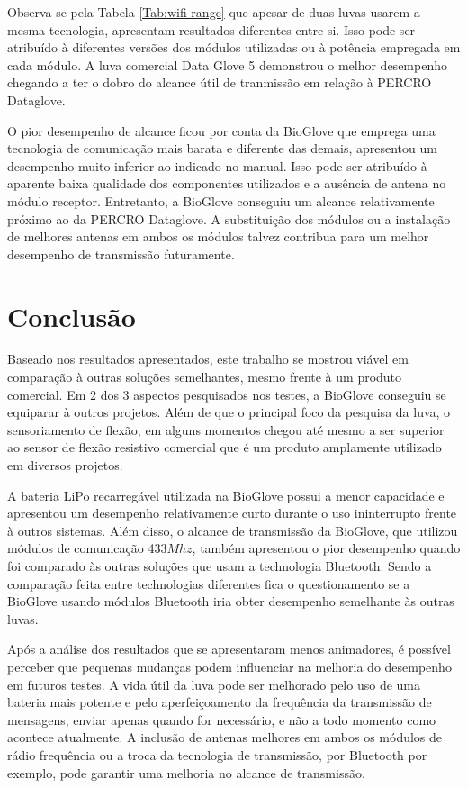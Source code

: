 \documentclass[
	12pt,				%
	openright,			%
	oneside,			%
	a4paper,			%
	english,			%
	brazil				%
	]{abntex2}
\begin{document}
			Observa-se pela Tabela \ref{Tab:wifi-range} que apesar de duas luvas usarem a mesma tecnologia, apresentam resultados diferentes entre si. Isso pode ser atribuído à diferentes versões dos módulos utilizadas ou à potência empregada em cada módulo. A luva comercial Data Glove 5 demonstrou o melhor desempenho chegando a ter o dobro do alcance útil de tranmissão em relação à PERCRO Dataglove.

			O pior desempenho de alcance ficou por conta da BioGlove que emprega uma tecnologia de comunicação mais barata e diferente das demais, apresentou um desempenho muito inferior ao indicado no manual. Isso pode ser atribuído à aparente baixa qualidade dos componentes utilizados e a ausência de antena no módulo receptor. Entretanto, a BioGlove conseguiu um alcance relativamente próximo ao da PERCRO Dataglove. A substituição dos módulos ou a instalação de melhores antenas em ambos os módulos talvez contribua para um melhor desempenho de transmissão futuramente.





		\chapter{Conclusão}
		
		Baseado nos resultados apresentados, este trabalho se mostrou viável em comparação à outras soluções semelhantes, mesmo frente à um produto comercial. Em 2 dos 3 aspectos pesquisados nos testes, a BioGlove conseguiu se equiparar à outros projetos. Além de que o principal foco da pesquisa da luva, o sensoriamento de flexão, em alguns momentos chegou até mesmo a ser superior ao sensor de flexão resistivo comercial que é um produto amplamente utilizado em diversos projetos.

		A bateria LiPo recarregável utilizada na BioGlove possui a menor capacidade e apresentou um desempenho relativamente curto durante o uso ininterrupto frente à outros sistemas. Além disso, o alcance de transmissão da BioGlove, que utilizou módulos de comunicação 433$Mhz$, também apresentou o pior desempenho quando foi comparado às outras soluções que usam a technologia Bluetooth. Sendo a comparação feita entre technologias diferentes fica o questionamento se a BioGlove usando módulos Bluetooth iria obter desempenho semelhante às outras luvas.

		Após a análise dos resultados que se apresentaram menos animadores, é possível perceber que pequenas mudanças podem influenciar na melhoria do desempenho em futuros testes. A vida útil da luva pode ser melhorado pelo uso de uma bateria mais potente e pelo aperfeiçoamento da frequência da transmissão de mensagens, enviar apenas quando for necessário, e não a todo momento como acontece atualmente. A inclusão de antenas melhores em ambos os módulos de rádio frequência ou a troca da tecnologia de transmissão, por Bluetooth por exemplo, pode garantir uma melhoria no alcance de transmissão.
\end{document}
